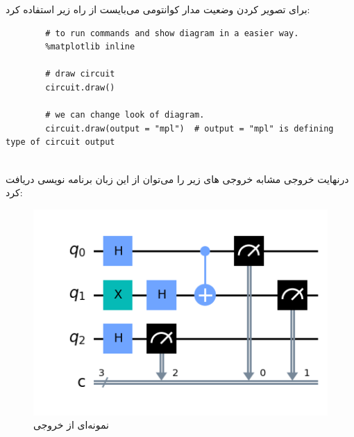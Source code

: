 \documentclass{book}
\begin{document}
برای تصویر کردن وضعیت مدار کوانتومی می‌بایست از راه زیر استفاده کرد:

\begin{latin}
	\begin{verbatim}
		# to run commands and show diagram in a easier way.
		%matplotlib inline 
		
		# draw circuit
		circuit.draw()
		
		# we can change look of diagram.
		circuit.draw(output = "mpl")  # output = "mpl" is defining type of circuit output
		
	\end{verbatim}
\end{latin}



درنهایت خروجی مشابه خروجی های زیر را می‌توان از این زبان برنامه نویسی دریافت کرد:

\begin{center}
	\begin{figure}[ht]
		\centering
		\includegraphics[]{tutorials_circuits_advanced_03_advanced_circuit_visualization_7_0.png}
		\caption{نمونه‌ای از خروجی }
	\end{figure}
	
\end{center}
\end{document}

